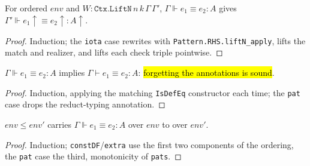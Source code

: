 \begin{lemma}
\label{thm:strong-weakn}
\leanok
{}

 For ordered $env$ and $W:\mathtt{Ctx.LiftN}\,n\,k\,\Gamma\,\Gamma'$,
$\Gamma \Vdash e_1\equiv e_2:A$ gives
$\Gamma'\Vdash e_1{\uparrow}\equiv e_2{\uparrow}:A{\uparrow}$.
\end{lemma}
\begin{proof}
\leanok
{} Induction; the \texttt{iota} case rewrites with \texttt{Pattern.RHS.liftN\_apply},
lifts the match and realizer, and lifts each check triple pointwise.
\end{proof}

\begin{theorem}
\label{thm:strong-defeq}
\leanok
{}

 $\Gamma\Vdash e_1\equiv e_2:A$ implies $\Gamma\vdash e_1\equiv e_2:A$:
\hl{forgetting the annotations is sound}.
\end{theorem}
\begin{proof}
\leanok
{} Induction, applying the matching \texttt{IsDefEq} constructor each time; the
\texttt{pat} case drops the reduct-typing annotation.
\end{proof}

\begin{lemma}
\label{thm:strong-mono}
\leanok
{}

 $env\le env'$ carries $\Gamma\Vdash e_1\equiv e_2:A$ over $env$ to over $env'$.
\end{lemma}
\begin{proof}
\leanok
{} Induction; \texttt{constDF}/\texttt{extra} use the first two components of the
ordering, the \texttt{pat} case the third, monotonicity of \texttt{pats}.
\end{proof}


